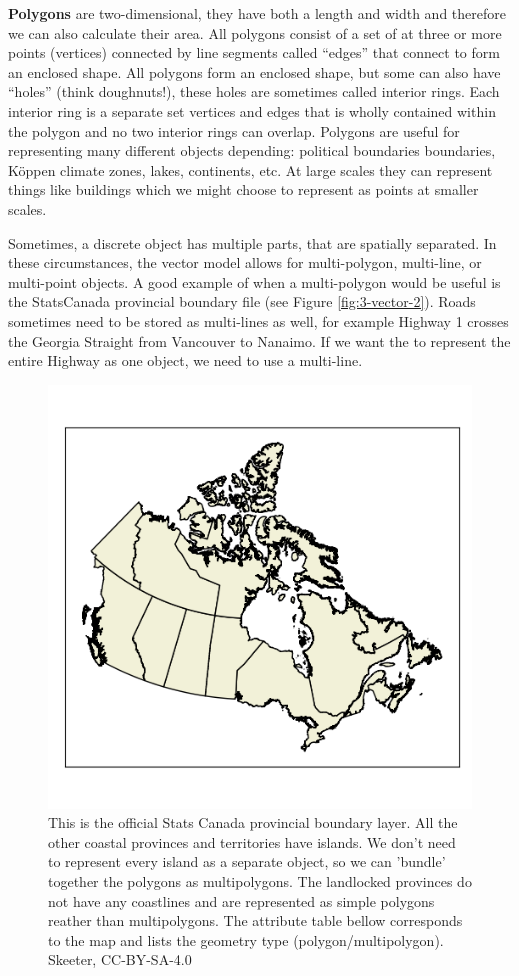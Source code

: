 \documentclass[
]{book}
\begin{document}
\textbf{Polygons} are two-dimensional, they have both a length and width and therefore we can also calculate their area. All polygons consist of a set of at three or more points (vertices) connected by line segments called ``edges'' that connect to form an enclosed shape. All polygons form an enclosed shape, but some can also have ``holes'' (think doughnuts!), these holes are sometimes called interior rings. Each interior ring is a separate set vertices and edges that is wholly contained within the polygon and no two interior rings can overlap. Polygons are useful for representing many different objects depending: political boundaries boundaries, Köppen climate zones, lakes, continents, etc. At large scales they can represent things like buildings which we might choose to represent as points at smaller scales.

Sometimes, a discrete object has multiple parts, that are spatially separated. In these circumstances, the vector model allows for multi-polygon, multi-line, or multi-point objects. A good example of when a multi-polygon would be useful is the StatsCanada provincial boundary file (see Figure \ref{fig:3-vector-2}). Roads sometimes need to be stored as multi-lines as well, for example Highway 1 crosses the Georgia Straight from Vancouver to Nanaimo. If we want the to represent the entire Highway as one object, we need to use a multi-line.

\begin{figure}
\includegraphics[width=0.75\linewidth]{images/03-vector} \caption{This is the official Stats Canada provincial boundary layer.  All the other coastal provinces and territories have islands.  We don't need to represent every island as a separate object, so we can 'bundle' together the polygons as multipolygons.  The landlocked provinces do not have any coastlines and are represented as simple polygons reather than multipolygons.  The attribute table bellow corresponds to the map and lists the geometry type (polygon/multipolygon). Skeeter, CC-BY-SA-4.0}\label{fig:3-vector2}
\end{figure}
\end{document}
